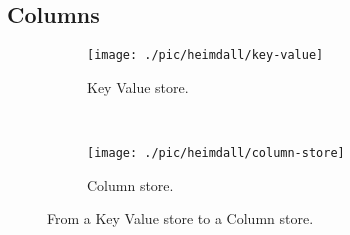 


\subsection{Columns}
\label{sec:heimdall:columns}
\begin{figure}[ht]
  \centering
  \begin{subfigure}[b]{0.5\textwidth}
                \centering
                \texttt{[image: ./pic/heimdall/key-value]}
                \caption{Key Value store.} 
                \label{fig:heimdall:columns-0}

        \end{subfigure}%
        ~
        \begin{subfigure}[b]{0.5\textwidth}
                \centering
                \texttt{[image: ./pic/heimdall/column-store]}
                \caption{Column store.}
                \label{fig:heimdall:columns-1}
        \end{subfigure}
  \caption{From a Key Value store to a Column store. }
  \label{fig:heimdall:columns} 
\end{figure}

